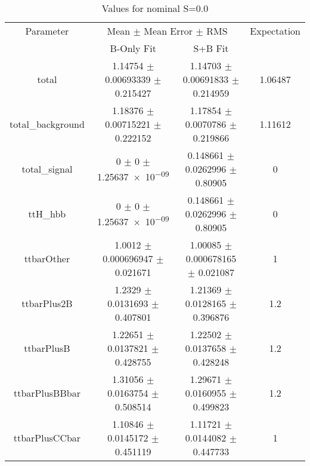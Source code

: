 \begin{table}
\centering
\caption{Values for nominal S=0.0}
\begin{tabular}{cccc}
\toprule
Parameter & \multicolumn{2}{c}{Mean $\pm$ Mean Error $\pm$ RMS} & Expectation\\
 & B-Only Fit & S+B Fit & \\
\midrule
total & \num{1.14754} $\pm$ \num{0.00693339} $\pm$ \num{0.215427} & \num{1.14703} $\pm$ \num{0.00691833} $\pm$ \num{0.214959} & \num{1.06487}\\
total\_background & \num{1.18376} $\pm$ \num{0.00715221} $\pm$ \num{0.222152} & \num{1.17854} $\pm$ \num{0.0070786} $\pm$ \num{0.219866} & \num{1.11612}\\
total\_signal & \num{0} $\pm$ \num{0} $\pm$ \num{1.25637e-09} & \num{0.148661} $\pm$ \num{0.0262996} $\pm$ \num{0.80905} & \num{0}\\
ttH\_hbb & \num{0} $\pm$ \num{0} $\pm$ \num{1.25637e-09} & \num{0.148661} $\pm$ \num{0.0262996} $\pm$ \num{0.80905} & \num{0}\\
ttbarOther & \num{1.0012} $\pm$ \num{0.000696947} $\pm$ \num{0.021671} & \num{1.00085} $\pm$ \num{0.000678165} $\pm$ \num{0.021087} & \num{1}\\
ttbarPlus2B & \num{1.2329} $\pm$ \num{0.0131693} $\pm$ \num{0.407801} & \num{1.21369} $\pm$ \num{0.0128165} $\pm$ \num{0.396876} & \num{1.2}\\
ttbarPlusB & \num{1.22651} $\pm$ \num{0.0137821} $\pm$ \num{0.428755} & \num{1.22502} $\pm$ \num{0.0137658} $\pm$ \num{0.428248} & \num{1.2}\\
ttbarPlusBBbar & \num{1.31056} $\pm$ \num{0.0163754} $\pm$ \num{0.508514} & \num{1.29671} $\pm$ \num{0.0160955} $\pm$ \num{0.499823} & \num{1.2}\\
ttbarPlusCCbar & \num{1.10846} $\pm$ \num{0.0145172} $\pm$ \num{0.451119} & \num{1.11721} $\pm$ \num{0.0144082} $\pm$ \num{0.447733} & \num{1}\\
\bottomrule
\end{tabular}
\end{table}